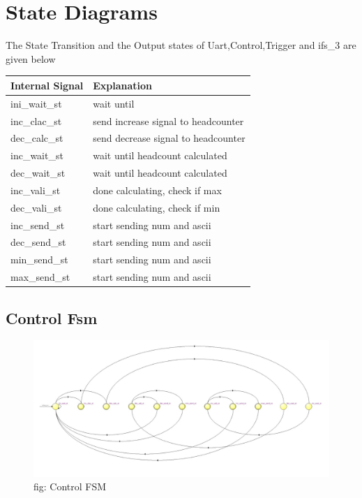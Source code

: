\documentclass[12pt,a4 paper] {article}
\begin{document}
\section{State Diagrams}
The State Transition and the Output states of Uart,Control,Trigger and ifs\_3 are given below\\
 \begin{center}
	\begin{tabular}{| p{4cm} | p{7cm} |}
		\hline
		Internal Signal & Explanation \\
		\hline
		ini\_wait\_st & wait until\\
		\hline
		inc\_clac\_st& send increase signal to headcounter\\
		\hline
		dec\_calc\_st&     send decrease signal to headcounter\\
		\hline
		inc\_wait\_st&    wait until headcount calculated\\
		\hline
		dec\_wait\_st&     wait until headcount calculated\\
		\hline
		inc\_vali\_st&    done calculating, check if max\\
		\hline
		dec\_vali\_st&     done calculating, check if min\\
		\hline
		inc\_send\_st&    start sending num and ascii\\
		\hline
		dec\_send\_st&    start sending num and ascii\\
		\hline
		min\_send\_st&    start sending num and ascii\\
		\hline
		max\_send\_st&     start sending num and ascii\\
		\hline
		
	\end{tabular}
\end{center}
\newpage
\subsection{Control Fsm}
\begin{figure}[h]
	\centering	
	\includegraphics[scale=0.3]{../png/Control.png}
	\newline
	fig: Control FSM\\
\end{figure}
\end{document}

